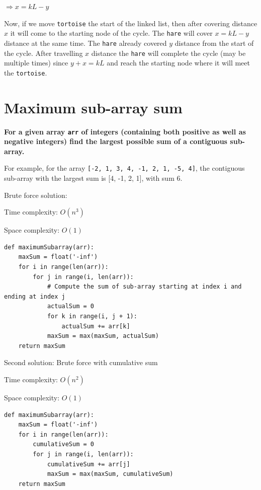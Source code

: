 \documentclass[a4paper,11pt]{book}
\begin{document}
$\Rightarrow x = k L - y$

Now, if we move \lstinline{tortoise} the start of the linked list, then after covering distance $x$ it will come to the starting node of the cycle. The \lstinline{hare} will cover $x = k L-y$ distance at the same time. The \lstinline{hare} already covered $y$ distance from the start of the cycle. After travelling $x$ distance the \lstinline{hare} will complete the cycle (may be multiple times) since $y+x=k L$ and reach the starting node where it will meet the \lstinline{tortoise}.

\newpage
\section{Maximum sub-array sum}

\noindent \textbf{For a given array \lstinline{arr} of integers (containing both positive as well as negative integers) find the largest possible sum of a contiguous sub-array.}
\vspace{5mm}

\noindent For example, for the array \lstinline{[-2, 1, 3, 4, -1, 2, 1, -5, 4]}, the contiguous sub-array with the largest sum is [4, -1, 2, 1], with sum 6.
\vspace{5mm}

\noindent Brute force solution:

\noindent Time complexity: $O(n^3)$

\noindent Space complexity: $O(1)$

\begin{lstlisting}
def maximumSubarray(arr):
    maxSum = float('-inf')
    for i in range(len(arr)):
        for j in range(i, len(arr)):
            # Compute the sum of sub-array starting at index i and ending at index j
            actualSum = 0
            for k in range(i, j + 1):
                actualSum += arr[k]
            maxSum = max(maxSum, actualSum)
    return maxSum
\end{lstlisting}

\noindent Second solution: Brute force with cumulative sum

\noindent Time complexity: $O(n^2)$

\noindent Space complexity: $O(1)$

\begin{lstlisting}
def maximumSubarray(arr):
    maxSum = float('-inf')
    for i in range(len(arr)):
        cumulativeSum = 0
        for j in range(i, len(arr)):
            cumulativeSum += arr[j]
            maxSum = max(maxSum, cumulativeSum)
    return maxSum
\end{lstlisting}
\end{document}
